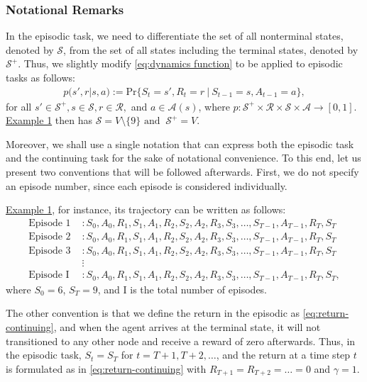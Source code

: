 \subsubsection{Notational Remarks}
In the episodic task, we need to differentiate the set of all nonterminal states, denoted by $\mathcal{S}$, from the set of all states including the terminal states, denoted by $\mathcal{S}^+$. Thus, we slightly modify \eqref{eq:dynamics function} to be applied to episodic tasks as follows:
\begin{align}
    p(s',r|s,a) := \text{Pr}\{S_t=s', R_t=r \ | \ S_{t-1} = s, A_{t-1} = a\},
\end{align}
for all $s' \in \mathcal{S}^+, s \in \mathcal{S}, r \in \mathcal{R},$ and $a \in \mathcal{A}(s)$, where $p : \mathcal{S}^+ \times \mathcal{R} \times \mathcal{S} \times \mathcal{A} \rightarrow [0,1]$. \hyperref[fig:toy graph]{Example 1} then has $\mathcal{S} = V \setminus \{9\} \text{ and } \ \mathcal{S}^+ = V$.

Moreover, we shall use a single notation that can express both the episodic task and the continuing task for the sake of notational convenience. To this end, let us present two conventions that will be followed afterwards. First, we do not specify an episode number, since each episode is considered individually.

\hyperref[fig:toy graph]{Example 1}, for instance, its trajectory can be written as follows:
\begin{align*}
    \text{Episode 1 }&: S_0, A_0, R_1, S_1, A_1, R_2, S_2, A_2, R_3, S_3, \dots, S_{T-1}, A_{T-1}, R_{T}, S_{T}\\ 
    \text{Episode 2 }&: S_0, A_0, R_1, S_1, A_1, R_2, S_2, A_2, R_3, S_3, \dots, S_{T-1}, A_{T-1}, R_{T}, S_{T}\\
    \text{Episode 3 }&: S_0, A_0, R_1, S_1, A_1, R_2, S_2, A_2, R_3, S_3, \dots, S_{T-1}, A_{T-1}, R_{T}, S_{T}\\
    &\vdots\\
    \text{Episode I }&: S_0, A_0, R_1, S_1, A_1, R_2, S_2, A_2, R_3, S_3, \dots, S_{T-1}, A_{T-1}, R_{T}, S_{T},
\end{align*}
where $S_0 = 6$, $S_T = 9$, and I is the total number of episodes.

The other convention is that we define the return in the episodic as \eqref{eq:return-continuing}, and when the agent arrives at the terminal state, it will not transitioned to any other node and receive a reward of zero afterwards. Thus, in the episodic task, $S_t = S_T$ for $t = T+1, T+2, \dots$, and the return at a time step $t$ is formulated as in \eqref{eq:return-continuing} with $R_{T+1} = R_{T+2} = \dots = 0$ and $\gamma = 1$.

